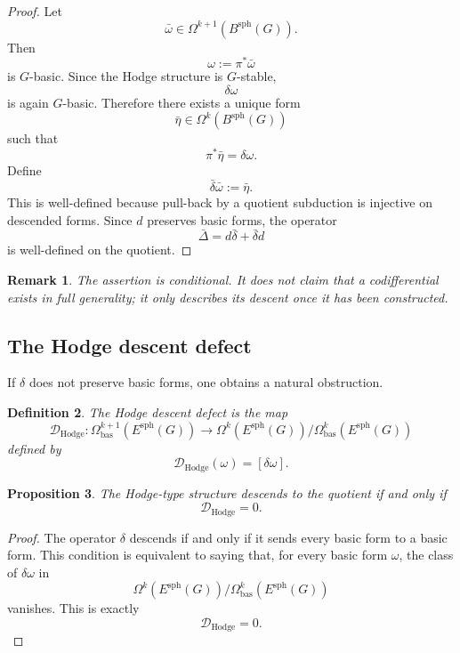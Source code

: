 \documentclass[11pt]{amsart}
\newtheorem{definition}{Definition}[section]
\newtheorem{proposition}[definition]{Proposition}
\newtheorem{remark}[definition]{Remark}
\begin{document}
\begin{proof}
Let
\[
\bar\omega\in \Omega^{k+1}(B^{\mathrm{sph}}(G)).
\]
Then
\[
\omega:=\pi^*\bar\omega
\]
is \(G\)-basic. Since the Hodge structure is \(G\)-stable,
\[
\delta\omega
\]
is again \(G\)-basic. Therefore there exists a unique form
\[
\bar\eta\in\Omega^k(B^{\mathrm{sph}}(G))
\]
such that
\[
\pi^*\bar\eta=\delta\omega.
\]
Define
\[
\bar\delta\bar\omega:=\bar\eta.
\]
This is well-defined because pull-back by a quotient subduction is injective
on descended forms. Since \(d\) preserves basic forms, the operator
\[
\bar\Delta=d\bar\delta+\bar\delta d
\]
is well-defined on the quotient.
\end{proof}

\begin{remark}
The assertion is conditional. It does not claim that a codifferential exists in
full generality; it only describes its descent once it has been constructed.
\end{remark}

\subsection{The Hodge descent defect}

If \(\delta\) does not preserve basic forms, one obtains a natural obstruction.

\begin{definition}
The \emph{Hodge descent defect} is the map
\[
\mathcal D_{\mathrm{Hodge}}
:
\Omega^{k+1}_{\mathrm{bas}}(E^{\mathrm{sph}}(G))
\longrightarrow
\Omega^k(E^{\mathrm{sph}}(G))/
\Omega^k_{\mathrm{bas}}(E^{\mathrm{sph}}(G))
\]
defined by
\[
\mathcal D_{\mathrm{Hodge}}(\omega)
=
[\delta\omega].
\]
\end{definition}

\begin{proposition}
The Hodge-type structure descends to the quotient if and only if
\[
\mathcal D_{\mathrm{Hodge}}=0.
\]
\end{proposition}

\begin{proof}
The operator \(\delta\) descends if and only if it sends every basic form to a
basic form. This condition is equivalent to saying that, for every basic form
\(\omega\), the class of \(\delta\omega\) in
\[
\Omega^k(E^{\mathrm{sph}}(G))/
\Omega^k_{\mathrm{bas}}(E^{\mathrm{sph}}(G))
\]
vanishes. This is exactly
\[
\mathcal D_{\mathrm{Hodge}}=0.
\]
\end{proof}
\end{document}
